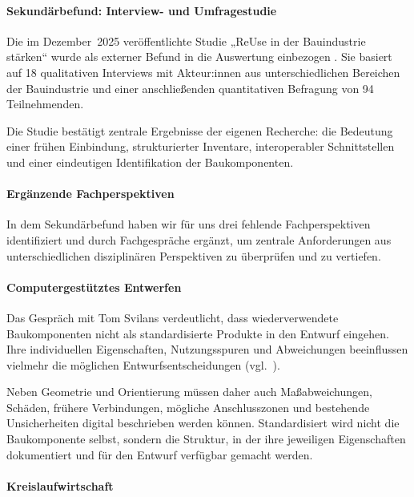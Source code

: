 \documentclass[type=zwischenbericht]{zukunftbau}
\begin{document}
\begin{SemioNest}

\paragraph{Sekundärbefund: Interview- und Umfragestudie}

Die im Dezember~2025 veröffentlichte Studie „ReUse in der Bauindustrie stärken“ wurde als externer Befund in die Auswertung einbezogen \cite{baselcircular-reuse-2025}. Sie basiert auf 18 qualitativen Interviews mit Akteur:innen aus unterschiedlichen Bereichen der Bauindustrie und einer anschließenden quantitativen Befragung von 94 Teilnehmenden.

Die Studie bestätigt zentrale Ergebnisse der eigenen Recherche: die Bedeutung einer frühen Einbindung, strukturierter Inventare, interoperabler Schnittstellen und einer eindeutigen Identifikation der Baukomponenten.


\paragraph{Ergänzende Fachperspektiven}
In dem Sekundärbefund haben wir für uns drei fehlende Fachperspektiven identifiziert und durch Fachgespräche ergänzt, um zentrale Anforderungen aus unterschiedlichen disziplinären Perspektiven zu überprüfen und zu vertiefen.

\begin{SemioNest}

\paragraph{Computergestütztes Entwerfen}

Das Gespräch mit Tom Svilans verdeutlicht, dass wiederverwendete Baukomponenten nicht als standardisierte Produkte in den Entwurf eingehen. Ihre individuellen Eigenschaften, Nutzungsspuren und Abweichungen beeinflussen vielmehr die möglichen Entwurfsentscheidungen (vgl.\ ).

Neben Geometrie und Orientierung müssen daher auch Maßabweichungen, Schäden, frühere Verbindungen, mögliche Anschlusszonen und bestehende Unsicherheiten digital beschrieben werden können. Standardisiert wird nicht die Baukomponente selbst, sondern die Struktur, in der ihre jeweiligen Eigenschaften dokumentiert und für den Entwurf verfügbar gemacht werden.

\paragraph{Kreislaufwirtschaft}


\end{SemioNest}
\end{SemioNest}
\end{document}

